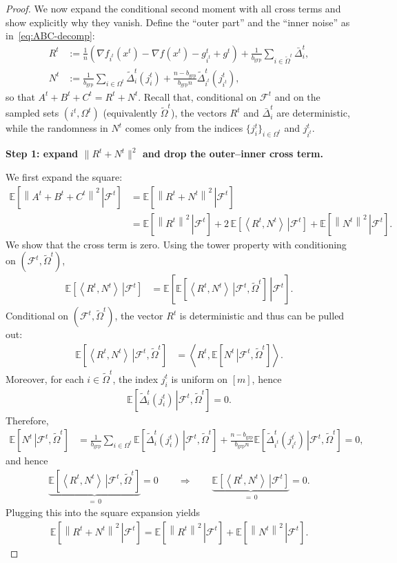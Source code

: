 \documentclass{article}
\newcommand{\inner}[2]{\left\langle #1, #2 \right\rangle}
\newcommand{\sqn}[1]{\left\| #1 \right\|^2}
\newcommand{\eqdef}{:=}
\newcommand{\Expb}[2]{\mathbb{E}\!\left[\left. #1\,\right|#2 \right]}
\newcommand{\Expc}[1]{\Expb{#1}{\mathcal{F}^t}}
\theoremstyle{plain}
\begin{document}
\begin{proof}
We now expand the conditional second moment with all cross terms and show explicitly why they vanish.
Define the ``outer part'' and the ``inner noise'' as in~\eqref{eq:ABC-decomp}:
\begin{align*}
R^t &\eqdef \frac{1}{n}\left(\nabla f_{i^t}(x^{t})-\nabla f(x^{t})-g_{i^t}^t+g^t\right)
+\frac{1}{b_{\mathrm{grp}}}\sum_{i\in\tilde{\Omega}^t}\bar{\Delta}_i^t,\\
N^t &\eqdef \frac{1}{b_{\mathrm{grp}}}\sum_{i\in\Omega^t}\widetilde{\Delta}_i^t(j_i^t)
+\frac{n-b_{\mathrm{grp}}}{b_{\mathrm{grp}}n}\widetilde{\Delta}_{i^t}^t(j_{i^t}^t),
\end{align*}
so that $A^t+B^t+C^t = R^t+N^t$.
Recall that, conditional on $\mathcal{F}^t$ and on the sampled sets $(i^t,\Omega^t)$ (equivalently $\tilde{\Omega}^t$),
the vectors $R^t$ and $\bar{\Delta}_i^t$ are deterministic, while the randomness in $N^t$ comes only from the indices
$\{j_i^t\}_{i\in\Omega^t}$ and $j_{i^t}^t$.

\textbf{Step 1: expand $\|R^t+N^t\|^2$ and drop the outer--inner cross term.}

We first expand the square:
\begin{align*}
\Expc{\sqn{A^t+B^t+C^t}}
&=\Expc{\sqn{R^t+N^t}} \\
&=\Expc{\sqn{R^t}} + 2\,\Expc{\inner{R^t}{N^t}} + \Expc{\sqn{N^t}}.
\end{align*}
We show that the cross term is zero. Using the tower property with conditioning on $(\mathcal{F}^t,\tilde{\Omega}^t)$,
\begin{align*}
\Expc{\inner{R^t}{N^t}}
&=\Expb{\Expb{\inner{R^t}{N^t}}{\mathcal{F}^t,\tilde{\Omega}^t}}{\mathcal{F}^t}.
\end{align*}
Conditional on $(\mathcal{F}^t,\tilde{\Omega}^t)$, the vector $R^t$ is deterministic and thus can be pulled out:
\begin{align*}
\Expb{\inner{R^t}{N^t}}{\mathcal{F}^t,\tilde{\Omega}^t}
&=\inner{R^t}{\Expb{N^t}{\mathcal{F}^t,\tilde{\Omega}^t}}.
\end{align*}
Moreover, for each $i\in\tilde{\Omega}^t$, the index $j_i^t$ is uniform on $[m]$, hence
\begin{align*}
\Expb{\widetilde{\Delta}_i^t(j_i^t)}{\mathcal{F}^t,\tilde{\Omega}^t}=0.
\end{align*}
Therefore,
\begin{align*}
\Expb{N^t}{\mathcal{F}^t,\tilde{\Omega}^t}
&=\frac{1}{b_{\mathrm{grp}}}\sum_{i\in\Omega^t}\Expb{\widetilde{\Delta}_i^t(j_i^t)}{\mathcal{F}^t,\tilde{\Omega}^t}
+\frac{n-b_{\mathrm{grp}}}{b_{\mathrm{grp}}n}\Expb{\widetilde{\Delta}_{i^t}^t(j_{i^t}^t)}{\mathcal{F}^t,\tilde{\Omega}^t}
=0,
\end{align*}
and hence
\begin{align*}
\underbrace{\Expb{\inner{R^t}{N^t}}{\mathcal{F}^t,\tilde{\Omega}^t}}_{=\,0}=0
\qquad\Longrightarrow\qquad
\underbrace{\Expc{\inner{R^t}{N^t}}}_{=\,0}=0.
\end{align*}
Plugging this into the square expansion yields
\begin{align*}
\Expc{\sqn{R^t+N^t}}=\Expc{\sqn{R^t}}+\Expc{\sqn{N^t}}.
\end{align*}


\end{proof}
\end{document}
